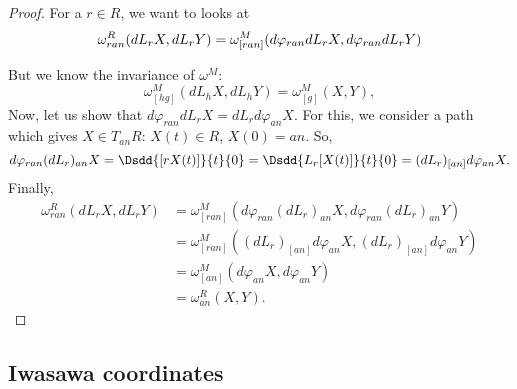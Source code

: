 \begin{proof}
	For a $r\in R$, we want to looks at
	\begin{equation}
		\omega^R_{ran}(dL_rX,dL_rY)=\omega^M_{[ran]}(d\varphi_{ran}dL_rX,d\varphi_{ran}dL_rY)\\
	\end{equation}

	But we know the invariance of $\omega^M$:
	\[
		\omega^M_{[hg]}(dL_hX,dL_hY)=\omega^M_{[g]}(X,Y),
	\]
	Now, let us show that $d\varphi_{ran}dL_rX=dL_rd\varphi_{an}X$. For this, we consider a path which gives $X\in T_{an}R$: $X(t)\in R$, $X(0)=an$. So,
	\begin{equation}
		d\varphi_{ran}(dL_r)_{an}X=\Dsdd{[rX(t)]}{t}{0}
		=\Dsdd{L_r[X(t)]}{t}{0}
		=(dL_r)_{[an]}d\varphi_{an}X.
	\end{equation}
	Finally,
	\begin{equation}
		\begin{split}
			\omega_{ran}^R(dL_rX,dL_rY)&=\omega^M_{[ran]}(d\varphi_{ran}(dL_r)_{an}X,d\varphi_{ran}(dL_r)_{an}Y)\\
			&=\omega^M_{[ran]}( (dL_r)_{[an]}d\varphi_{an}X,(dL_r)_{[an]}d\varphi_{an}Y )\\
			&=\omega^M_{[an]}(d\varphi_{an}X,d\varphi_{an}Y)\\
			&=\omega^R_{an}(X,Y).
		\end{split}
	\end{equation}

\end{proof}


\subsection{Iwasawa coordinates}


